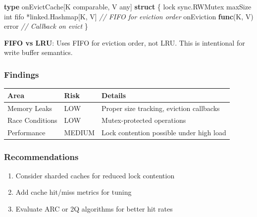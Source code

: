 \documentclass[
]{article}
\newenvironment{Shaded}{}{}
\newcommand{\CommentTok}[1]{\textcolor[rgb]{0.38,0.63,0.69}{\textit{#1}}}
\newcommand{\DataTypeTok}[1]{\textcolor[rgb]{0.56,0.13,0.00}{#1}}
\newcommand{\KeywordTok}[1]{\textcolor[rgb]{0.00,0.44,0.13}{\textbf{#1}}}
\newcommand{\NormalTok}[1]{#1}
\newcommand{\OperatorTok}[1]{\textcolor[rgb]{0.40,0.40,0.40}{#1}}
\newcounter{none} %
\providecommand{\tightlist}{%
  \setlength{\itemsep}{0pt}\setlength{\parskip}{0pt}}
\begin{document}
\begin{Shaded}
\begin{Highlighting}[]
\KeywordTok{type}\NormalTok{ onEvictCache}\OperatorTok{[}\NormalTok{K }\DataTypeTok{comparable}\OperatorTok{,}\NormalTok{ V }\DataTypeTok{any}\OperatorTok{]} \KeywordTok{struct} \OperatorTok{\{}
\NormalTok{    lock       sync}\OperatorTok{.}\NormalTok{RWMutex}
\NormalTok{    maxSize    }\DataTypeTok{int}
\NormalTok{    fifo       }\OperatorTok{*}\NormalTok{linked}\OperatorTok{.}\NormalTok{Hashmap}\OperatorTok{[}\NormalTok{K}\OperatorTok{,}\NormalTok{ V}\OperatorTok{]}  \CommentTok{// FIFO for eviction order}
\NormalTok{    onEviction }\KeywordTok{func}\OperatorTok{(}\NormalTok{K}\OperatorTok{,}\NormalTok{ V}\OperatorTok{)} \DataTypeTok{error}       \CommentTok{// Callback on evict}
\OperatorTok{\}}
\end{Highlighting}
\end{Shaded}

\textbf{FIFO vs LRU}: Uses FIFO for eviction order, not LRU. This is
intentional for write buffer semantics.

\subsubsection{Findings}\label{findings-5}

{\def\LTcaptype{none} %
\begin{longtable}[]{@{}lll@{}}
\toprule\noalign{}
Area & Risk & Details \\
\midrule\noalign{}
\endhead
\bottomrule\noalign{}
\endlastfoot
Memory Leaks & LOW & Proper size tracking, eviction callbacks \\
Race Conditions & LOW & Mutex-protected operations \\
Performance & MEDIUM & Lock contention possible under high load \\
\end{longtable}
}

\subsubsection{Recommendations}\label{recommendations-4}

\begin{enumerate}
\def\labelenumi{\arabic{enumi}.}
\tightlist
\item
  Consider sharded caches for reduced lock contention
\item
  Add cache hit/miss metrics for tuning
\item
  Evaluate ARC or 2Q algorithms for better hit rates
\end{enumerate}
\end{document}

